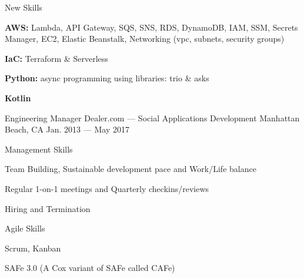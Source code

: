 \vspace{-2.00mm}
\begin{cventries}

\cventry
    {New Skills} %
    {} %
    {} %
    {} %
    {    
      \begin{cvitems} %
        \item {\textbf{AWS:} Lambda, API Gateway, SQS, SNS, RDS, DynamoDB, IAM, SSM, Secrets Manager, EC2, Elastic Beanstalk, Networking (vpc, subnets, security groups)}
        \item {\textbf{IaC:} Terraform \& Serverless}
        \item {\textbf{Python:} async programming using libraries: trio \& asks}
        \item {\textbf{Kotlin}}
      \end{cvitems}
    }

\pagebreak

  \cventry
    {Engineering Manager} %
    {Dealer.com --- Social Applications Development} %
    {Manhattan Beach, CA} %
    {Jan. 2013 --- May 2017} %
    {}
    \vspace{-4.00mm}

  \cventry
    {Management Skills} %
    {} %
    {} %
    {} %
    { \vspace{-0.5mm}
      \begin{cvitems} %
        \item {Team Building, Sustainable development pace and Work/Life balance}
        \item {Regular 1-on-1 meetings and Quarterly checkins/reviews}
        \item {Hiring and Termination}
      \end{cvitems}
    }

  \cventry
    {Agile Skills} %
    {} %
    {} %
    {} %
    { \vspace{-0.5mm}
      \begin{cvitems} %
        \item {Scrum, Kanban}
        \item {SAFe 3.0 (A Cox variant of SAFe called CAFe)}
      \end{cvitems}
    }


\end{cventries}
